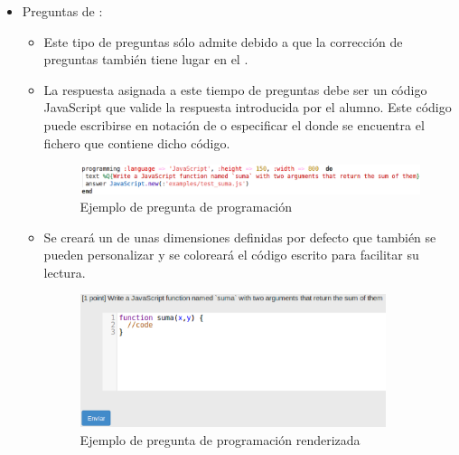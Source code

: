 \begin{itemize}
\begin{itemize}
    \item Preguntas de :
    \begin{itemize}
      \item Este tipo de preguntas s\'olo admite   debido a que la correcci\'on de preguntas tambi\'en 
      tiene lugar en el  .
      \item La respuesta asignada a este tiempo de preguntas debe ser un c\'odigo JavaScript que valide la respuesta introducida
      por el alumno. Este c\'odigo puede escribirse en notaci\'on de  o especificar el  donde se encuentra el
      fichero que contiene dicho c\'odigo.
      
      \begin{figure}[!th]
      \begin{center}
      \includegraphics[width=1.1\textwidth,height=0.1\textwidth]{images/programming1.eps}
      \caption{Ejemplo de pregunta de programaci\'on}
      \label{fig:programming1}
      \end{center}
      \end{figure}
      \newpage
      
      \item Se crear\'a un  de unas dimensiones definidas por defecto que tambi\'en se pueden personalizar
      y se colorear\'a el c\'odigo escrito para facilitar su lectura.
      
      \begin{figure}[!th]
      \begin{center}
      \includegraphics[width=0.9\textwidth]{images/programming1r.eps}
      \caption{Ejemplo de pregunta de programaci\'on renderizada}
      \label{fig:programming1r}
      \end{center}
      \end{figure}
      

\end{itemize}
\end{itemize}
\end{itemize}
